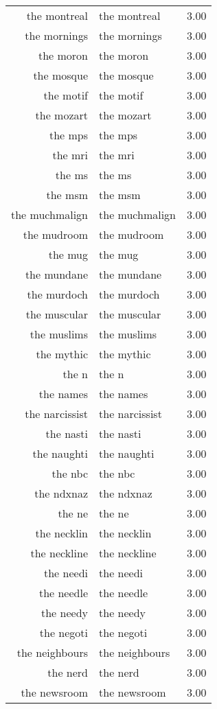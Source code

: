 \begin{table}[ht]
\begin{tabular}{rlr}
  the montreal & the montreal & 3.00 \\ 
  the mornings & the mornings & 3.00 \\ 
  the moron & the moron & 3.00 \\ 
  the mosque & the mosque & 3.00 \\ 
  the motif & the motif & 3.00 \\ 
  the mozart & the mozart & 3.00 \\ 
  the mps & the mps & 3.00 \\ 
  the mri & the mri & 3.00 \\ 
  the ms & the ms & 3.00 \\ 
  the msm & the msm & 3.00 \\ 
  the muchmalign & the muchmalign & 3.00 \\ 
  the mudroom & the mudroom & 3.00 \\ 
  the mug & the mug & 3.00 \\ 
  the mundane & the mundane & 3.00 \\ 
  the murdoch & the murdoch & 3.00 \\ 
  the muscular & the muscular & 3.00 \\ 
  the muslims & the muslims & 3.00 \\ 
  the mythic & the mythic & 3.00 \\ 
  the n & the n & 3.00 \\ 
  the names & the names & 3.00 \\ 
  the narcissist & the narcissist & 3.00 \\ 
  the nasti & the nasti & 3.00 \\ 
  the naughti & the naughti & 3.00 \\ 
  the nbc & the nbc & 3.00 \\ 
  the ndxnaz & the ndxnaz & 3.00 \\ 
  the ne & the ne & 3.00 \\ 
  the necklin & the necklin & 3.00 \\ 
  the neckline & the neckline & 3.00 \\ 
  the needi & the needi & 3.00 \\ 
  the needle & the needle & 3.00 \\ 
  the needy & the needy & 3.00 \\ 
  the negoti & the negoti & 3.00 \\ 
  the neighbours & the neighbours & 3.00 \\ 
  the nerd & the nerd & 3.00 \\ 
  the newsroom & the newsroom & 3.00 \\ 

\end{tabular}
\end{table}
